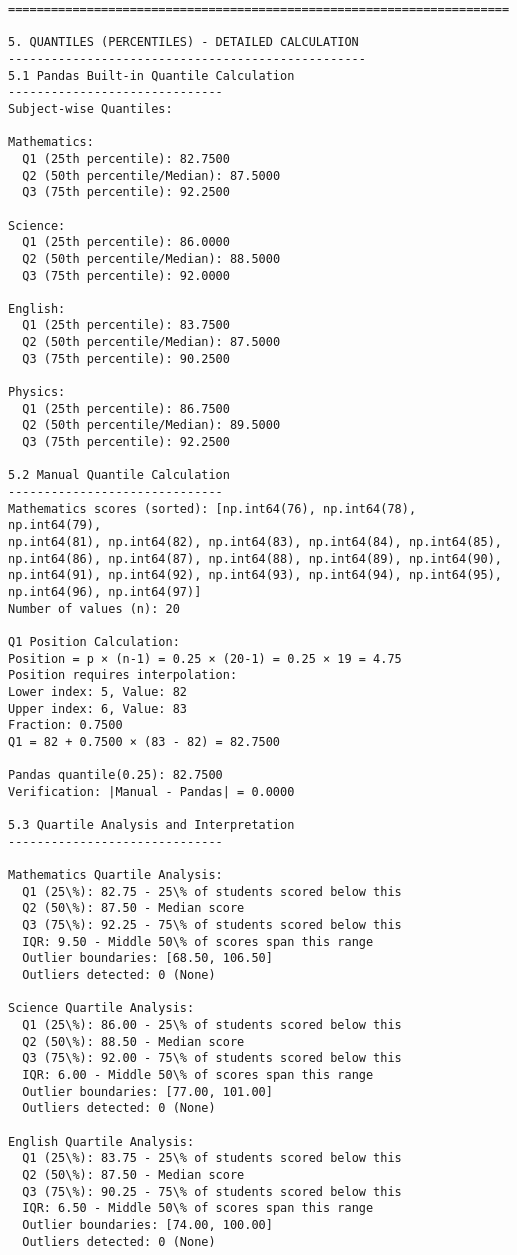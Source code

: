 \documentclass[11pt]{article}
\begin{document}
\begin{Verbatim}[commandchars=\\\{\}]
======================================================================

5. QUANTILES (PERCENTILES) - DETAILED CALCULATION
--------------------------------------------------
5.1 Pandas Built-in Quantile Calculation
------------------------------
Subject-wise Quantiles:

Mathematics:
  Q1 (25th percentile): 82.7500
  Q2 (50th percentile/Median): 87.5000
  Q3 (75th percentile): 92.2500

Science:
  Q1 (25th percentile): 86.0000
  Q2 (50th percentile/Median): 88.5000
  Q3 (75th percentile): 92.0000

English:
  Q1 (25th percentile): 83.7500
  Q2 (50th percentile/Median): 87.5000
  Q3 (75th percentile): 90.2500

Physics:
  Q1 (25th percentile): 86.7500
  Q2 (50th percentile/Median): 89.5000
  Q3 (75th percentile): 92.2500

5.2 Manual Quantile Calculation
------------------------------
Mathematics scores (sorted): [np.int64(76), np.int64(78), np.int64(79),
np.int64(81), np.int64(82), np.int64(83), np.int64(84), np.int64(85),
np.int64(86), np.int64(87), np.int64(88), np.int64(89), np.int64(90),
np.int64(91), np.int64(92), np.int64(93), np.int64(94), np.int64(95),
np.int64(96), np.int64(97)]
Number of values (n): 20

Q1 Position Calculation:
Position = p × (n-1) = 0.25 × (20-1) = 0.25 × 19 = 4.75
Position requires interpolation:
Lower index: 5, Value: 82
Upper index: 6, Value: 83
Fraction: 0.7500
Q1 = 82 + 0.7500 × (83 - 82) = 82.7500

Pandas quantile(0.25): 82.7500
Verification: |Manual - Pandas| = 0.0000

5.3 Quartile Analysis and Interpretation
------------------------------

Mathematics Quartile Analysis:
  Q1 (25\%): 82.75 - 25\% of students scored below this
  Q2 (50\%): 87.50 - Median score
  Q3 (75\%): 92.25 - 75\% of students scored below this
  IQR: 9.50 - Middle 50\% of scores span this range
  Outlier boundaries: [68.50, 106.50]
  Outliers detected: 0 (None)

Science Quartile Analysis:
  Q1 (25\%): 86.00 - 25\% of students scored below this
  Q2 (50\%): 88.50 - Median score
  Q3 (75\%): 92.00 - 75\% of students scored below this
  IQR: 6.00 - Middle 50\% of scores span this range
  Outlier boundaries: [77.00, 101.00]
  Outliers detected: 0 (None)

English Quartile Analysis:
  Q1 (25\%): 83.75 - 25\% of students scored below this
  Q2 (50\%): 87.50 - Median score
  Q3 (75\%): 90.25 - 75\% of students scored below this
  IQR: 6.50 - Middle 50\% of scores span this range
  Outlier boundaries: [74.00, 100.00]
  Outliers detected: 0 (None)


\end{Verbatim}
\end{document}
